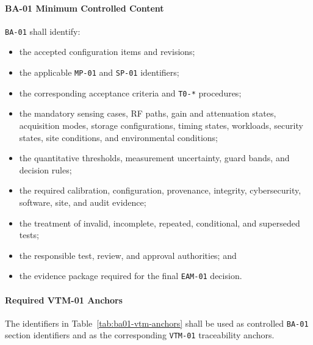 \documentclass[11pt,a4paper]{article}
\begin{document}
	\paragraph*{BA-01 Minimum Controlled Content}
	
	\texttt{BA-01} shall identify:
	
	\begin{itemize}[leftmargin=*]
		\item the accepted configuration items and revisions;
		\item the applicable \texttt{MP-01} and \texttt{SP-01} identifiers;
		\item the corresponding acceptance criteria and \texttt{T0-*}
		procedures;
		\item the mandatory sensing cases, RF paths, gain and attenuation states,
		acquisition modes, storage configurations, timing states, workloads,
		security states, site conditions, and environmental conditions;
		\item the quantitative thresholds, measurement uncertainty, guard bands,
		and decision rules;
		\item the required calibration, configuration, provenance, integrity,
		cybersecurity, software, site, and audit evidence;
		\item the treatment of invalid, incomplete, repeated, conditional, and
		superseded tests;
		\item the responsible test, review, and approval authorities; and
		\item the evidence package required for the final \texttt{EAM-01}
		decision.
	\end{itemize}
	
	\paragraph*{Required VTM-01 Anchors}
	
	The identifiers in Table~\ref{tab:ba01-vtm-anchors} shall be used as
	controlled \texttt{BA-01} section identifiers and as the corresponding
	\texttt{VTM-01} traceability anchors.
	
\end{document}
